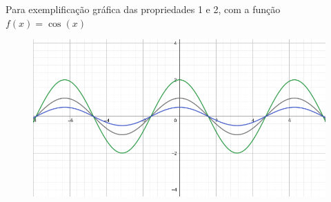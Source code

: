 \begin{multicols*}{2}
    Para exemplificação gráfica das propriedades 1 e 2, com a função $f(x) = \cos(x)$
    \begin{figure}[H]
        \includegraphics[scale=0.3]{assets/rafael/img10.png}
    \end{figure}


\end{multicols*}
